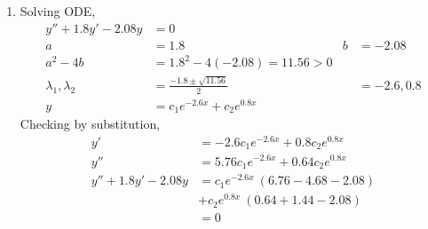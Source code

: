 \begin{enumerate}
    \item Solving ODE,
          \begin{align}
              y'' + 1.8y' - 2.08y      & = 0                                                 \\
              a                        & = 1.8                             & b & = -2.08     \\
              a^{2} - 4b               & = 1.8^{2} - 4(-2.08) = 11.56 > 0                    \\
              \lambda_{1}, \lambda_{2} & = \frac{-1.8 \pm \sqrt{11.56}}{2} &   & = -2.6, 0.8 \\
              y                        & = c_{1}e^{-2.6x} + c_{2}e^{0.8x}
          \end{align}
          Checking by substitution,
          \begin{align}
              y'                  & = -2.6c_{1}e^{-2.6x} + 0.8c_{2}e^{0.8x}  \\
              y''                 & = 5.76c_{1}e^{-2.6x} + 0.64c_{2}e^{0.8x} \\
              y'' + 1.8y' - 2.08y & = c_{1}e^{-2.6x}\ (6.76 - 4.68 - 2.08)   \\
                                  & + c_{2}e^{0.8x}\ (0.64 + 1.44 - 2.08)    \\
                                  & = 0
          \end{align}


\end{enumerate}
